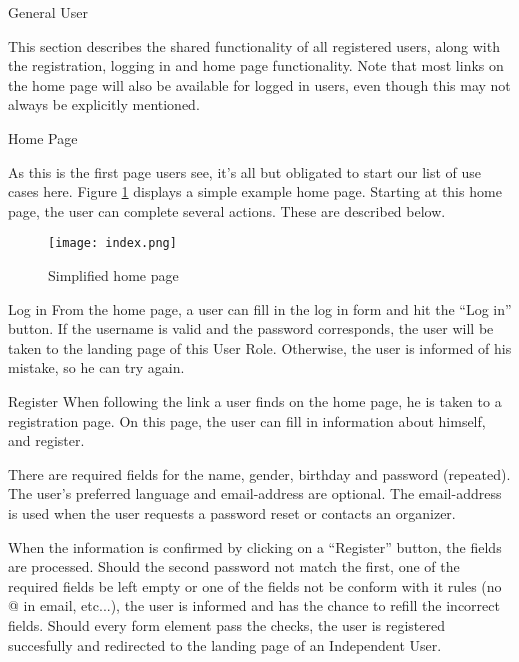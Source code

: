 
\begin{section}{General User}

    This section describes the shared functionality of all registered users,
    along with the registration, logging in and home page functionality. Note
    that most links on the home page will also be available for logged in users,
    even though this may not always be explicitly mentioned.

    \begin{subsection}{Home Page}

        As this is the first page users see, it's all but obligated to start our
        list of use cases here. Figure \ref{img:index} displays a simple example
        home page. Starting at this home page, the user can complete several
        actions. These are described below.

        \begin{figure}[b]
            \centering
            \texttt{[image: index.png]}
            \caption{Simplified home page}
            \label{img:index}
        \end{figure}

        \begin{subsubsection}{Log in}
            From the home page, a user can fill in the log in form and hit the
            ``Log in'' button. If the username is valid and the password
            corresponds, the user will be taken to the landing page of this User
            Role. Otherwise, the user is informed of his mistake, so he can try
            again.
        \end{subsubsection}

        \begin{subsubsection}{Register}
            When following the link a user finds on the home page, he is taken
            to a registration page. On this page, the user can fill in
            information about himself, and register.

            There are required fields for the name, gender, birthday and
            password (repeated). The user's preferred language and
            email-address are optional. The email-address is used when the user
            requests a password reset or contacts an organizer.

            When the information is confirmed by clicking on a ``Register''
            button, the fields are processed. Should the second password not
            match the first, one of the required fields be left empty or one of
            the fields not be conform with it rules (no @ in email, etc...), the
            user is informed and has the chance to refill the incorrect fields.
            Should every form element pass the checks, the user is registered
            succesfully and redirected to the landing page of an Independent
            User.
        \end{subsubsection}


\end{subsection}
\end{section}
